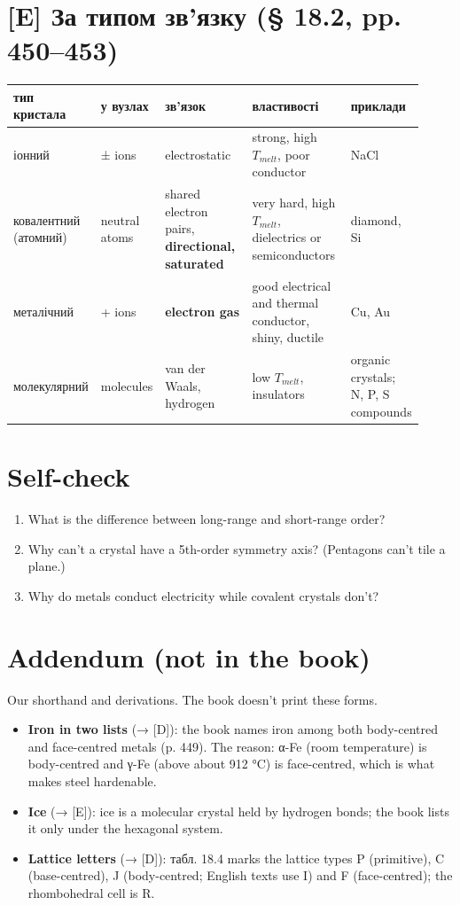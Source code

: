 \documentclass[11pt,a4paper,oneside]{book}
\begin{document}
\section*{[E] За типом зв'язку (§ 18.2, pp. 450–453)}
{\footnotesize
\begin{longtable}{>{\raggedright\arraybackslash}p{0.138\linewidth}>{\raggedright\arraybackslash}p{0.103\linewidth}>{\raggedright\arraybackslash}p{0.244\linewidth}>{\raggedright\arraybackslash}p{0.262\linewidth}>{\raggedright\arraybackslash}p{0.172\linewidth}}
\toprule
\textbf{тип кристала} & \textbf{у вузлах} & \textbf{зв'язок} & \textbf{властивості} & \textbf{приклади} \\
\midrule
\endhead
іонний & ± ions & electrostatic & strong, high $T_{melt}$, poor conductor & NaCl \\
ковалентний (атомний) & neutral atoms & shared electron pairs, \textbf{directional, saturated} & very hard, high $T_{melt}$, dielectrics or semiconductors & diamond, Si \\
металічний & + ions & \textbf{electron gas} & good electrical and thermal conductor, shiny, ductile & Cu, Au \\
молекулярний & molecules & van der Waals, hydrogen & low $T_{melt}$, insulators & organic crystals; N, P, S compounds \\
\bottomrule
\end{longtable}
}

\section*{Self-check}
\begin{enumerate}
\item What is the difference between long-range and short-range order?
\item Why can't a crystal have a 5th-order symmetry axis? (Pentagons can't tile a plane.)
\item Why do metals conduct electricity while covalent crystals don't?
\end{enumerate}

\section*{Addendum (not in the book)}
Our shorthand and derivations. The book doesn't print these forms.
\begin{itemize}
\item \textbf{Iron in two lists} (→ [D]): the book names iron among both body-centred and face-centred metals (p. 449). The reason: α-Fe (room temperature) is body-centred and γ-Fe (above about 912 °C) is face-centred, which is what makes steel hardenable.
\item \textbf{Ice} (→ [E]): ice is a molecular crystal held by hydrogen bonds; the book lists it only under the hexagonal system.
\item \textbf{Lattice letters} (→ [D]): табл. 18.4 marks the lattice types P (primitive), C (base-centred), J (body-centred; English texts use I) and F (face-centred); the rhombohedral cell is R.
\end{itemize}
\end{document}
